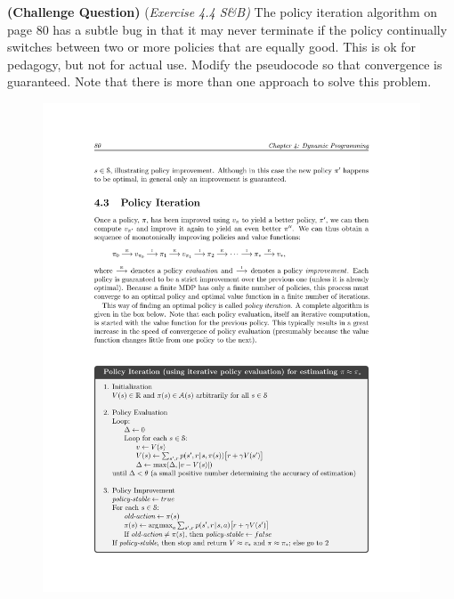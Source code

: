 \textbf{(Challenge Question)} (\textit{Exercise 4.4 S\&B)} The policy iteration algorithm on page 80 has a subtle bug in that it may never terminate if the policy continually switches between two or more policies that are equally good. This is ok for pedagogy, but not for actual use. Modify the pseudocode so that convergence is guaranteed. Note that there is more than one approach to solve this problem. 

\begin{figure}[h!]
\centering
\includegraphics[scale=0.9]{figures/pseudocode_pi.pdf}
\end{figure}